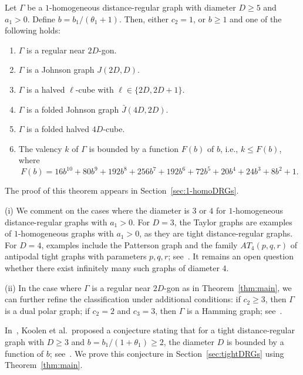 \begin{theorem}\label{thm:main}
Let $\Gamma$ be a $1$-homogeneous distance-regular graph with diameter $D \geqslant 5$ and $a_1 > 0$. 
Define $b = {b_1}/({\theta_1 + 1})$. 
Then, either $c_2=1$, or $b\geqslant 1$ and one of the following holds:
\begin{enumerate}[\normalfont(i)]
	\item $\Gamma$ is a regular near $2D$-gon.
	\item $\Gamma$ is a Johnson graph $J(2D,D)$.
	\item $\Gamma$ is a halved $\ell$-cube with $\ell \in \{2D,2D+1\}$.
	\item $\Gamma$ is a folded Johnson graph $\bar{J}(4D,2D)$.
	\item $\Gamma$ is a folded halved $4D$-cube.
	\item The valency $k$ of $\Gamma$ is bounded by a function $F(b)$ of $b$, {\rm i.e.}, $k \leqslant F(b)$, where
	\begin{equation}\label{poly: F}
	F(b) = 16b^{10} + 80b^9 + 192b^8 + 256b^7 + 192b^6 + 72b^5 + 20b^4 + 24b^3 + 8b^2 + 1. 
	\end{equation}
\end{enumerate}
\end{theorem}
The proof of this theorem appears in Section~\ref{sec:1-homoDRGs}.

\begin{rema} 
(i) We comment on the cases where the diameter is $3$ or $4$ for $1$-homogeneous distance-regular graphs with $a_1 > 0$.
For $D = 3$, the Taylor graphs are examples of $1$-homogeneous graphs with $a_1 > 0$, as they are tight distance-regular graphs. 
For $D = 4$, examples include the Patterson graph and the family $AT_4(p, q, r)$ of antipodal tight graphs with parameters $p, q, r$; see~\cite{JK2002, JK2011}. 
It remains an open question whether there exist infinitely many such graphs of diameter $4$.

(ii) In the case where $\Gamma$ is a regular near $2D$-gon as in Theorem~\ref{thm:main}, we can further refine the classification under additional conditions: 
if $c_2 \geqslant 3$, then $\Gamma$ is a dual polar graph; 
if $c_2 = 2$ and $c_3 = 3$, then $\Gamma$ is a Hamming graph; see~\cite[Theorem~9.11]{DaKoTa}.
\end{rema}


\begin{rema}
In~\cite{KLLLLT2023+}, Koolen et al.\ proposed a conjecture stating that for a tight distance-regular graph with $D \geqslant 3$ and $b = b_1 / (1 + \theta_1) \geqslant 2$, the diameter $D$ is bounded by a function of $b$; see~\cite[Conjecture 7.5]{KLLLLT2023+}. We prove this conjecture in Section~\ref{sec:tightDRGs} using Theorem~\ref{thm:main}.
\end{rema}



